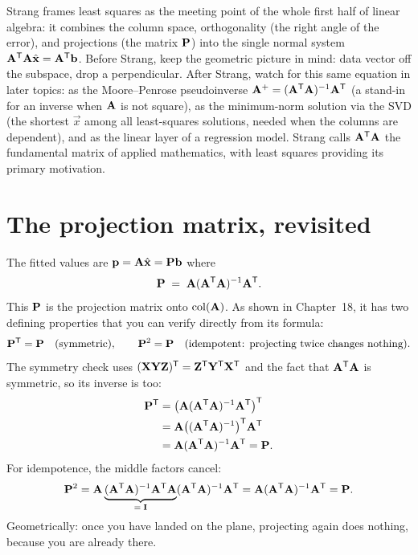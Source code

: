 \begin{strangbox}
Strang frames least squares as the meeting point of the whole first half of linear
algebra: it combines the column space, orthogonality (the right angle of the error),
and projections (the matrix $\mathbf{P}$) into the single normal system
$\mathbf{A}^{\mathsf{T}}\mathbf{A}\hat{\mathbf{x}}=\mathbf{A}^{\mathsf{T}}\mathbf{b}$. Before Strang, keep the geometric
picture in mind: data vector off the subspace, drop a perpendicular. After Strang,
watch for this same equation in later topics: as the Moore--Penrose
pseudoinverse $\mathbf{A}^{+}=(\mathbf{A}^{\mathsf{T}}\mathbf{A})^{-1}\mathbf{A}^{\mathsf{T}}$ (a stand-in for an inverse when
$\mathbf{A}$ is not square), as the minimum-norm solution via the SVD (the shortest $\vec{x}$
among all least-squares solutions, needed when the columns are dependent), and as the linear
layer of a regression model. Strang
calls $\mathbf{A}^{\mathsf{T}}\mathbf{A}$ the fundamental matrix of applied mathematics, with least
squares providing its primary motivation.
\end{strangbox}

\section{The projection matrix, revisited}

The fitted values are $\mathbf{p}=\mathbf{A}\hat{\mathbf{x}}=\mathbf{P}\mathbf{b}$
where
\[
  \mathbf{P} \;=\; \mathbf{A}(\mathbf{A}^{\mathsf{T}}\mathbf{A})^{-1}\mathbf{A}^{\mathsf{T}}.
\]
This $\mathbf{P}$ is the projection matrix onto $\operatorname{col}(\mathbf{A})$. As shown in Chapter~18, it
has two defining properties that you can verify directly from its formula:
\[
  \mathbf{P}^{\mathsf{T}}=\mathbf{P}\quad(\text{symmetric}),
  \qquad
  \mathbf{P}^2=\mathbf{P}\quad(\text{idempotent: projecting twice changes nothing}).
\]
The symmetry check uses $(\mathbf{X}\mathbf{Y}\mathbf{Z})^{\mathsf{T}}=\mathbf{Z}^{\mathsf{T}}\mathbf{Y}^{\mathsf{T}}\mathbf{X}^{\mathsf{T}}$ and the fact that
$\mathbf{A}^{\mathsf{T}}\mathbf{A}$ is symmetric, so its inverse is too:
\begin{align*}
  \mathbf{P}^{\mathsf{T}} &= \bigl(\mathbf{A}(\mathbf{A}^{\mathsf{T}}\mathbf{A})^{-1}\mathbf{A}^{\mathsf{T}}\bigr)^{\mathsf{T}}\\
  &= \mathbf{A}\bigl((\mathbf{A}^{\mathsf{T}}\mathbf{A})^{-1}\bigr)^{\mathsf{T}}\mathbf{A}^{\mathsf{T}}\\
  &= \mathbf{A}(\mathbf{A}^{\mathsf{T}}\mathbf{A})^{-1}\mathbf{A}^{\mathsf{T}} = \mathbf{P}.
\end{align*}
For idempotence, the middle factors cancel:
\[
  \mathbf{P}^2 = \mathbf{A}\underbrace{(\mathbf{A}^{\mathsf{T}}\mathbf{A})^{-1}\mathbf{A}^{\mathsf{T}}\mathbf{A}}_{=\;\mathbf{I}}
  (\mathbf{A}^{\mathsf{T}}\mathbf{A})^{-1}\mathbf{A}^{\mathsf{T}}
  = \mathbf{A}(\mathbf{A}^{\mathsf{T}}\mathbf{A})^{-1}\mathbf{A}^{\mathsf{T}} = \mathbf{P}.
\]
Geometrically:
once you have landed on the plane, projecting again does nothing, because you are already there.

